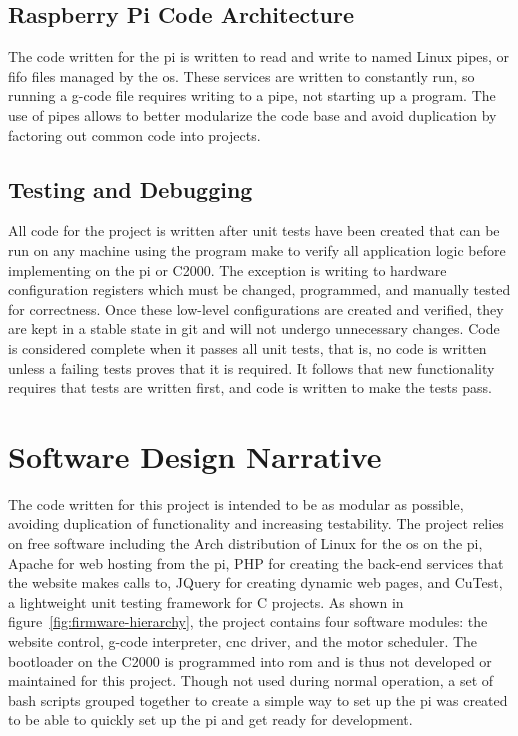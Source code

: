 \subsection{Raspberry Pi Code Architecture}
The code written for the \gls{pi} is written to read and write to named Linux pipes, or \gls{fifo} files managed by the \gls{os}.
These services are written to constantly run, so running a g-code file requires writing to a pipe, not starting up a program.
The use of pipes allows to better modularize the code base and avoid duplication by factoring out common code into projects.

\subsection{Testing and Debugging}
All code for the project is written after unit tests have been created that can be run on any machine using the program make to verify all application logic before implementing on the \gls{pi} or C2000.
The exception is writing to hardware configuration registers which must be changed, programmed, and manually tested for correctness.
Once these low-level configurations are created and verified, they are kept in a stable state in git and will not undergo unnecessary changes.
Code is considered complete when it passes all unit tests, that is, no code is written unless a failing tests proves that it is required.
It follows that new functionality requires that tests are written first, and code is written to make the tests pass.

\section{Software Design Narrative}
The code written for this project is intended to be as modular as possible, avoiding duplication of functionality and increasing testability.
The project relies on free software including the Arch distribution of Linux\cite{archlinux} for the \gls{os} on the \gls{pi}, Apache for web hosting from the \gls{pi}, PHP for creating the back-end services that the website makes calls to, JQuery for creating dynamic web pages, and CuTest, a lightweight unit testing framework for C projects.
As shown in figure~\ref{fig:firmware-hierarchy}, the project contains four software modules: the website control, g-code interpreter, \gls{cnc} driver, and the motor scheduler.
The bootloader on the C2000 is programmed into \gls{rom} and is thus not developed or maintained for this project.
Though not used during normal operation, a set of bash scripts grouped together to create a simple way to set up the \gls{pi} was created to be able to quickly set up the \gls{pi} and get ready for development.


